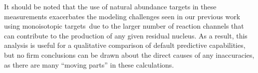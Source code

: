 It should be noted that the use of natural abundance targets in these measurements exacerbates the modeling  challenges seen in our previous work using monoisotopic targets\,\cite{Voyles2018a} 
due to the larger number  of reaction channels that can contribute to the production of any given residual nucleus.
As a result, this analysis is useful for a qualitative comparison of default predictive capabilities, but no firm conclusions can be drawn about the direct causes of any inaccuracies, as there are many \enquote{moving parts} in these calculations.





% 








